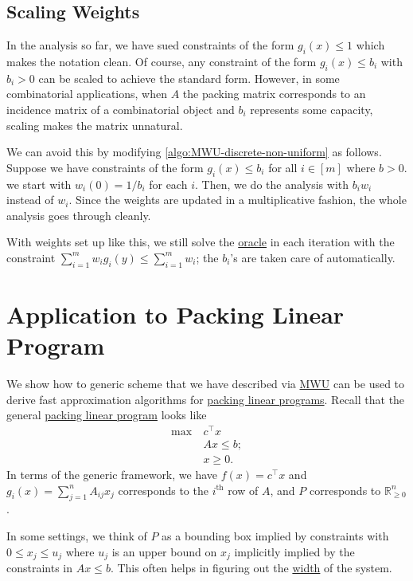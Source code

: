 \subsection{Scaling Weights}
In the analysis so far, we have sued constraints of the form \(g_i(x) \leq 1\) which makes the notation clean. Of course, any constraint of the form \(g_i(x) \leq b_i\) with \(b_i > 0\) can be scaled to achieve the standard form. However, in some combinatorial applications, when \(A\) the packing matrix corresponds to an incidence matrix of a combinatorial object and \(b_i\) represents some capacity, scaling makes the matrix unnatural.

We can avoid this by modifying \autoref{algo:MWU-discrete-non-uniform} as follows. Suppose we have constraints of the form \(g_i(x) \leq b_i\) for all \(i \in [m]\) where \(b > 0\). we start with \(w_i(0) = 1 / b_i\) for each \(i\). Then, we do the analysis with \(b_i w_i\) instead of \(w_i\). Since the weights are updated in a multiplicative fashion, the whole analysis goes through cleanly.

\begin{note}
	With weights set up like this, we still solve the \hyperref[eq:MWU-oracle]{oracle} in each iteration with the constraint \(\sum_{i=1}^{m} w_i g_i(y) \leq \sum_{i=1}^{m} w_i\); the \(b_i\)'s are taken care of automatically.
\end{note}

\section{Application to Packing Linear Program}
We show how to generic scheme that we have described via \hyperref[algo:MWU-discrete-non-uniform]{MWU} can be used to derive fast approximation algorithms for \hyperref[def:packing-LP]{packing linear programs}. Recall that the general \hyperref[def:packing-LP]{packing linear program} looks like
\[
	\begin{aligned}
		\max~ & c^{\top} x  \\
		      & Ax \leq b ; \\
		      & x \geq 0.
	\end{aligned}
\]
In terms of the generic framework, we have \(f(x) = c^{\top} x\) and \(g_i(x) = \sum_{j=1}^{n} A_{ij} x_j\) corresponds to the \(i^{\text{th} }\) row of \(A\), and \(P\) corresponds to \(\mathbb{R} _{\geq 0}^n\).

\begin{note}
	In some settings, we think of \(P\) as a bounding box implied by constraints with \(0 \leq x_j \leq u_j\) where \(u_j\) is an upper bound on \(x_j\) implicitly implied by the constraints in \(Ax \leq b\). This often helps in figuring out the \hyperref[def:width]{width} of the system.
\end{note}

